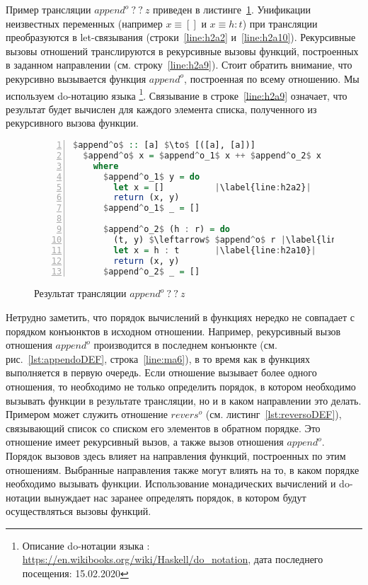 \documentclass[conference,american,russian]{IEEEtran}
\begin{document}
Пример трансляции $append^o \ ? \ ? \ z$ приведен в листинге~\ref{lst:appendoBWD}.  
Унификации неизвестных переменных (например $x \equiv []$ и $x \equiv h : t$) при трансляции преобразуются в let-связывания (строки~\ref{line:h2a2} и~\ref{line:h2a10}). 
Рекурсивные вызовы отношений транслируются в рекурсивные вызовы функций, построенных в заданном направлении (см. строку~\ref{line:h2a9}).
Стоит обратить внимание, что рекурсивно вызывается функция $append^o$, построенная по всему отношению.
Мы используем do-нотацию языка \haskell{}\footnote{Описание do-нотации языка \haskell{}: \url{https://en.wikibooks.org/wiki/Haskell/do\_notation}, дата последнего посещения: 15.02.2020}.
Связывание в строке~\ref{line:h2a9} означает, что результат будет вычислен для каждого элемента списка, полученного из рекурсивного вызова функции.

\begin{figure}[h!]
  \begin{center}
  \begin{minipage}{0.4\textwidth}
    \begin{lstlisting}[language=Haskell, frame=single, numbers=left,numberstyle=\small, escapechar=|]
  $append^o$ :: [a] $\to$ [([a], [a])]
  $append^o$ x = $append^o_1$ x ++ $append^o_2$ x
    where
      $append^o_1$ y = do
        let x = []          |\label{line:h2a2}|
        return (x, y)
      $append^o_1$ _ = []
      
      $append^o_2$ (h : r) = do
        (t, y) $\leftarrow$ $append^o$ r |\label{line:h2a9}|
        let x = h : t       |\label{line:h2a10}|
        return (x, y)
      $append^o_2$ _ = []
      \end{lstlisting}
  \end{minipage}
  \end{center}
  \caption{Результат трансляции $append^o \ ? \ ? \ z$ }
  \label{lst:appendoBWD}
\end{figure}

Нетрудно заметить, что порядок вычислений в функциях нередко не совпадает с порядком конъюнктов в исходном отношении. 
Например, рекурсивный вызов отношения $append^o$ производится в последнем конъюнкте (см. рис.~\ref{lst:appendoDEF}, строка~\ref{line:ma6}), в то время как в функциях выполняется в первую очередь. 
Если отношение вызывает более одного отношения, то необходимо не только определить порядок, в котором необходимо вызывать функции в результате трансляции, но и в каком направлении это делать. 
Примером может служить отношение $revers^o$ (см. листинг~\ref{lst:reversoDEF}), связывающий список со списком его элементов в обратном порядке.
Это отношение имеет рекурсивный вызов, а также вызов отношения $append^o$. 
Порядок вызовов здесь влияет на направления функций, построенных по этим отношениям.
Выбранные направления также могут влиять на то, в каком порядке необходимо вызывать функции. 
Использование монадических вычислений и do-нотации вынуждает нас заранее определять порядок, в котором будут осуществляться вызовы функций. 
\end{document}
